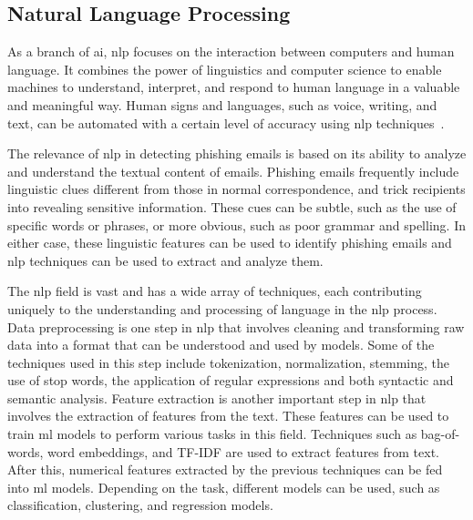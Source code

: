 \subsection{Natural Language Processing}


As a branch of \ac{ai}, \ac{nlp} focuses on the interaction between computers and human language. It combines the power of linguistics and computer science to enable machines to understand, interpret, and respond to human language in a valuable and meaningful way. Human signs and languages, such as voice, writing, and text, can be automated with a certain level of accuracy using \ac{nlp} techniques~\cite{Sathish20231612}.

The relevance of \ac{nlp} in detecting phishing emails is based on its ability to analyze and understand the textual content of emails. Phishing emails frequently include linguistic clues different from those in normal correspondence, and trick recipients into revealing sensitive information. These cues can be subtle, such as the use of specific words or phrases, or more obvious, such as poor grammar and spelling. In either case, these linguistic features can be used to identify phishing emails and \ac{nlp} techniques can be used to extract and analyze them.

The \ac{nlp} field is vast and has a wide array of techniques, each contributing uniquely to the understanding and processing of language in the \ac{nlp} process. Data preprocessing is one step in \ac{nlp} that involves cleaning and transforming raw data into a format that can be understood and used by models. Some of the techniques used in this step include tokenization, normalization, stemming, the use of stop words, the application of regular expressions and both syntactic and semantic analysis.
Feature extraction is another important step in \ac{nlp} that involves the extraction of features from the text. These features can be used to train \ac{ml} models to perform various tasks in this field. Techniques such as bag-of-words, word embeddings, and TF-IDF are used to extract features from text.
After this, numerical features extracted by the previous techniques can be fed into \ac{ml} models. Depending on the task, different models can be used, such as classification, clustering, and regression models.

